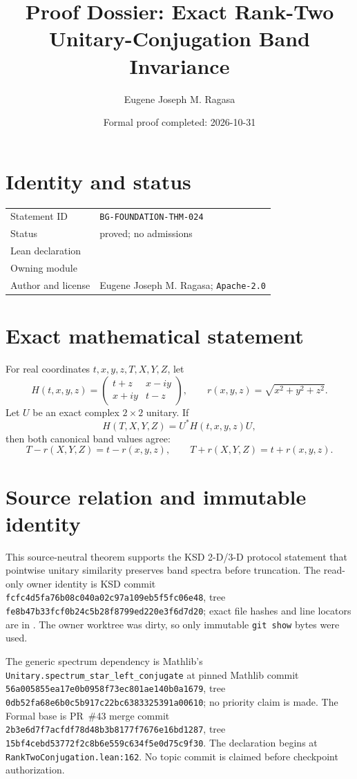 \documentclass[10pt]{article}
\title{Proof Dossier: Exact Rank-Two Unitary-Conjugation Band Invariance}
\author{Eugene Joseph M. Ragasa}
\date{Formal proof completed: 2026-10-31}
\begin{document}
\raggedright
\maketitle

\section{Identity and status}
\begin{tabularx}{\textwidth}{@{}lY@{}}
\toprule
Statement ID & \texttt{BG-FOUNDATION-THM-024} \\
Status & proved; no admissions \\
Lean declaration &  \\
Owning module &  \\
Author and license & Eugene Joseph M. Ragasa; \texttt{Apache-2.0} \\
\bottomrule
\end{tabularx}

\section{Exact mathematical statement}
For real coordinates $t,x,y,z,T,X,Y,Z$, let
\[
 H(t,x,y,z)=\begin{pmatrix}t+z&x-iy\\x+iy&t-z\end{pmatrix},
 \qquad r(x,y,z)=\sqrt{x^2+y^2+z^2}.
\]
Let $U$ be an exact complex $2\times2$ unitary. If
\[
 H(T,X,Y,Z)=U^*H(t,x,y,z)U,
\]
then both canonical band values agree:
\[
 T-r(X,Y,Z)=t-r(x,y,z),\qquad
 T+r(X,Y,Z)=t+r(x,y,z).
\]

\section{Source relation and immutable identity}
This source-neutral theorem supports the KSD 2-D/3-D protocol statement that pointwise unitary
similarity preserves band spectra before truncation. The read-only owner identity is KSD commit
\texttt{fcfc4d5fa76b08c040a02c97a109eb5f5fc06e48}, tree
\texttt{fe8b47b33fcf0b24c5b28f8799ed220e3f6d7d20}; exact file hashes and line locators are in
. The owner worktree was dirty, so only immutable \texttt{git show}
bytes were used.

The generic spectrum dependency is Mathlib's
\texttt{Unitary.spectrum\_star\_left\_conjugate} at pinned Mathlib commit
\texttt{56a005855ea17e0b0958f73ec801ae140b0a1679}, tree
\texttt{0db52fa68e6b0c5b917c22bc6383325391a00610}; no priority claim is made. The Formal base is
PR~\#43 merge commit \texttt{2b3e6d7f7acfdf78d48b3b8177f7676e16bd1287}, tree
\texttt{15bf4cebd53772f2c8b6e559c634f5e0d75c9f30}. The declaration begins at
\texttt{RankTwoConjugation.lean:162}. No topic commit is claimed before checkpoint authorization.
\end{document}
